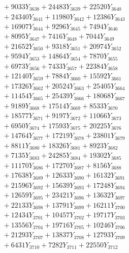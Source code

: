 \documentclass[a4paper,10pt]{article}
\begin{document}
{\begin{align}
&\;  + 9033 Y_{3638} + 24483 Y_{3639} + 22520 Y_{3640} \\[0.3ex]
&\;  + 24340 Y_{3641} + 11980 Y_{3642} + 12386 Y_{3643} \\[0.3ex]
&\;  + 16907 Y_{3644} + 9296 Y_{3645} + 7494 Y_{3646} \\[0.3ex]
&\;  + 8095 Y_{3647} + 7416 Y_{3648} + 7044 Y_{3649} \\[0.3ex]
&\;  + 21652 Y_{3650} + 9318 Y_{3651} + 20974 Y_{3652} \\[0.3ex]
&\;  + 9594 Y_{3653} + 14864 Y_{3654} + 7870 Y_{3655} \\[0.3ex]
&\;  + 6973 Y_{3656} + 7433 Y_{3657} + 22384 Y_{3658} \\[0.5ex]\allowbreak
&\;  + 12140 Y_{3659} + 7884 Y_{3660} + 15592 Y_{3661} \\[0.3ex]
&\;  + 17326 Y_{3662} + 20524 Y_{3663} + 25405 Y_{3664} \\[0.3ex]
&\;  + 11454 Y_{3665} + 25439 Y_{3666} + 18068 Y_{3667} \\[0.3ex]
&\;  + 9189 Y_{3668} + 17514 Y_{3669} + 8533 Y_{3670} \\[0.3ex]
&\;  + 18577 Y_{3671} + 9197 Y_{3672} + 11066 Y_{3673} \\[0.3ex]
&\;  + 6950 Y_{3674} + 17593 Y_{3675} + 20225 Y_{3676} \\[0.3ex]
&\;  + 14764 Y_{3677} + 17219 Y_{3678} + 23801 Y_{3679} \\[0.3ex]
&\;  + 8811 Y_{3680} + 18326 Y_{3681} + 8923 Y_{3682} \\[0.3ex]
&\;  + 7135 Y_{3683} + 24285 Y_{3684} + 19302 Y_{3685} \\[0.3ex]
&\;  + 11170 Y_{3686} + 17270 Y_{3687} + 8156 Y_{3688} \\[0.5ex]\allowbreak
&\;  + 17638 Y_{3689} + 12633 Y_{3690} + 16132 Y_{3691} \\[0.3ex]
&\;  + 21596 Y_{3692} + 15639 Y_{3693} + 17248 Y_{3694} \\[0.3ex]
&\;  + 12659 Y_{3695} + 23421 Y_{3696} + 13632 Y_{3697} \\[0.3ex]
&\;  + 22133 Y_{3698} + 13791 Y_{3699} + 16211 Y_{3700} \\[0.3ex]
&\;  + 12434 Y_{3701} + 10457 Y_{3702} + 19717 Y_{3703} \\[0.3ex]
&\;  + 13556 Y_{3704} + 19716 Y_{3705} + 10246 Y_{3706} \\[0.3ex]
&\;  + 21293 Y_{3707} + 13837 Y_{3708} + 12793 Y_{3709} \\[0.3ex]
&\;  + 6431 Y_{3710} + 7282 Y_{3711} + 22550 Y_{3712} \\[0.3ex]

\end{align}}
\end{document}
